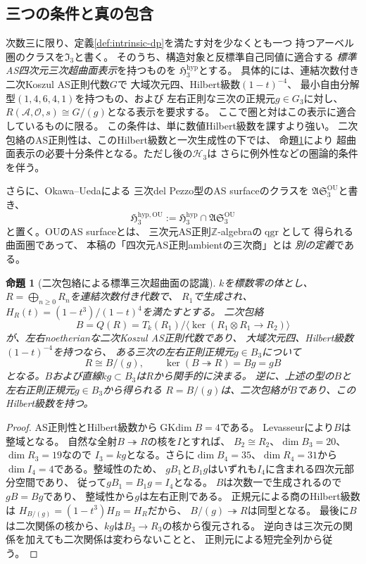 \documentclass[11pt,a4paper]{ltjsarticle}
\newtheorem{proposition}[theorem]{命題}
\theoremstyle{definition}
\begin{document}
\subsection{三つの条件と真の包含}

次数三に限り、定義\ref{def:intrinsic-dp}を満たす対を少なくとも一つ
持つアーベル圏のクラスを$\mathfrak I_3$と書く。
そのうち、構造対象と反標準自己同値に適合する
\emph{標準AS四次元三次超曲面表示}を持つものを
$\mathfrak H^{\mathrm{hyp}}_3$とする。
具体的には、連結次数付き二次Koszul AS正則代数$G$で
大域次元四、Hilbert級数$(1-t)^{-4}$、
最小自由分解型$(1,4,6,4,1)$を持つもの、および
左右正則な三次の正規元$g\in G_3$に対し、
$R(\mathcal A,\mathcal O,s)\cong G/(g)$となる表示を要求する。
ここで圏と対はこの表示に適合しているものに限る。
この条件は、単に数値Hilbert級数を課すより強い。
二次包絡のAS正則性は、このHilbert級数と一次生成性の下では、
命題\ref{prop:quadratic-envelope-recognition}により
超曲面表示の必要十分条件となる。ただし後の$\mathcal H_3$は
さらに例外性などの圏論的条件を伴う。

さらに、Okawa--Ueda\cite[Definition~1.1]{OU}による
三次del Pezzo型のAS surfaceのクラスを
$\mathfrak{AS}^{\mathrm{OU}}_3$と書き、
\[
 \mathfrak H^{\mathrm{hyp,OU}}_3
 :=\mathfrak H^{\mathrm{hyp}}_3\cap
   \mathfrak{AS}^{\mathrm{OU}}_3
\]
と置く。OUのAS surfaceとは、
三次元AS正則$\mathbb Z$-algebraの$\operatorname{qgr}$として
得られる曲面圏であって、
本稿の「四次元AS正則ambientの三次商」とは
\emph{別の定義}である。

\begin{proposition}[二次包絡による標準三次超曲面の認識]
\label{prop:quadratic-envelope-recognition}
$k$を標数零の体とし、$R=\bigoplus_{n\ge0}R_n$を連結次数付き代数で、
$R_1$で生成され、$H_R(t)=(1-t^3)/(1-t)^4$を満たすとする。
二次包絡
\[
 B=Q(R)=T_k(R_1)/\langle\ker(R_1\otimes R_1\longrightarrow R_2)\rangle
\]
が、左右noetherianな二次Koszul AS正則代数であり、
大域次元四、Hilbert級数$(1-t)^{-4}$を持つなら、
ある三次の左右正則正規元$g\in B_3$について
\begin{equation}\label{eq:envelope-recognition}
 R\cong B/(g),\qquad \ker(B\twoheadrightarrow R)=Bg=gB
\end{equation}
となる。$B$および直線$kg\subset B_3$は$R$から関手的に決まる。
逆に、上述の型の$B$と左右正則正規元$g\in B_3$から得られる
$R=B/(g)$は、二次包絡が$B$であり、このHilbert級数を持つ。
\end{proposition}
\begin{proof}
AS正則性とHilbert級数から$\operatorname{GKdim} B=4$である。
Levasseur\cite[Theorem~6.2(ii)]{Levasseur1992}により$B$は整域となる。
自然な全射$B\twoheadrightarrow R$の核を$I$とすれば、
$B_2\cong R_2$、$\dim B_3=20$、$\dim R_3=19$なので
$I_3=kg$となる。さらに$\dim B_4=35$、$\dim R_4=31$から
$\dim I_4=4$である。整域性のため、
$gB_1$と$B_1g$はいずれも$I_4$に含まれる四次元部分空間であり、
従って$gB_1=B_1g=I_4$となる。
$B$は次数一で生成されるので$gB=Bg$であり、
整域性から$g$は左右正則である。
正規元による商のHilbert級数は
$H_{B/(g)}=(1-t^3)H_B=H_R$だから、
$B/(g)\twoheadrightarrow R$は同型となる。
最後に$B$は二次関係の核から、$kg$は$B_3\to R_3$の核から復元される。
逆向きは三次元の関係を加えても二次関係は変わらないことと、
正則元による短完全列から従う。
\end{proof}
\end{document}
